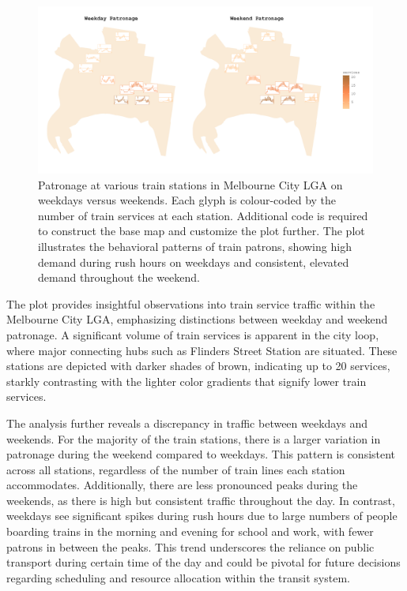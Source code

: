 \begin{figure}

{\centering \includegraphics[width=1\linewidth]{figures/weekend_weekday} 

}

\caption{Patronage at various train stations in Melbourne City LGA on weekdays versus weekends. Each glyph is colour-coded by the number of train services at each station. Additional code is required to construct the base map and customize the plot further. The plot illustrates the behavioral patterns of train patrons, showing high demand during rush hours on weekdays and consistent, elevated demand throughout the weekend.}\label{fig:unnamed-chunk-21}
\end{figure}

The plot provides insightful observations into train service traffic within the Melbourne City LGA, emphasizing distinctions between weekday and weekend patronage. A significant volume of train services is apparent in the city loop, where major connecting hubs such as Flinders Street Station are situated. These stations are depicted with darker shades of brown, indicating up to 20 services, starkly contrasting with the lighter color gradients that signify lower train services.

The analysis further reveals a discrepancy in traffic between weekdays and weekends. For the majority of the train stations, there is a larger variation in patronage during the weekend compared to weekdays. This pattern is consistent across all stations, regardless of the number of train lines each station accommodates. Additionally, there are less pronounced peaks during the weekends, as there is high but consistent traffic throughout the day. In contrast, weekdays see significant spikes during rush hours due to large numbers of people boarding trains in the morning and evening for school and work, with fewer patrons in between the peaks. This trend underscores the reliance on public transport during certain time of the day and could be pivotal for future decisions regarding scheduling and resource allocation within the transit system.

